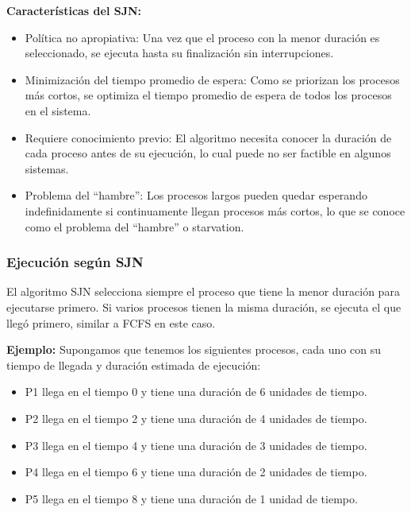 \textbf{Características del SJN:}
\begin{itemize} 
	\item Política no apropiativa: Una vez que el proceso con la menor duración es seleccionado, se ejecuta hasta su finalización sin interrupciones. 
	\item Minimización del tiempo promedio de espera: Como se priorizan los procesos más cortos, se optimiza el tiempo promedio de espera de todos los procesos en el sistema. \item Requiere conocimiento previo: El algoritmo necesita conocer la duración de cada proceso antes de su ejecución, lo cual puede no ser factible en algunos sistemas. \item Problema del ``hambre'': Los procesos largos pueden quedar esperando indefinidamente si continuamente llegan procesos más cortos, lo que se conoce como el problema del ``hambre'' o starvation. 
\end{itemize}

\subsubsection{Ejecución según SJN}

El algoritmo SJN selecciona siempre el proceso que tiene la menor duración para ejecutarse primero. Si varios procesos tienen la misma duración, se ejecuta el que llegó primero, similar a FCFS en este caso.

\textbf{Ejemplo:}
Supongamos que tenemos los siguientes procesos, cada uno con su tiempo de llegada y duración estimada de ejecución:

\begin{itemize} 
	\item P1 llega en el tiempo 0 y tiene una duración de 6 unidades de tiempo. 
	\item P2 llega en el tiempo 2 y tiene una duración de 4 unidades de tiempo. 
	\item P3 llega en el tiempo 4 y tiene una duración de 3 unidades de tiempo. 
	\item P4 llega en el tiempo 6 y tiene una duración de 2 unidades de tiempo. 
	\item P5 llega en el tiempo 8 y tiene una duración de 1 unidad de tiempo. 
\end{itemize}


